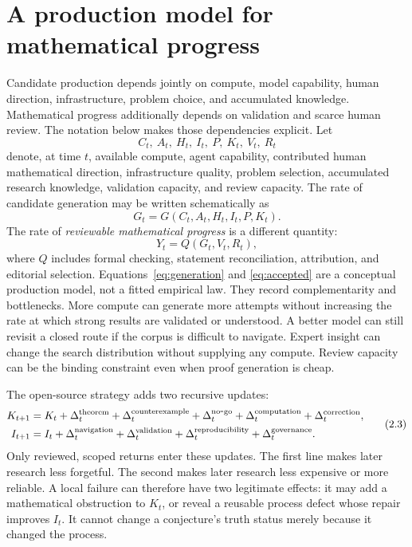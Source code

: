 \documentclass[10pt]{article}
\begin{document}
\section{A production model for mathematical progress}\label{sec:model}

Candidate production depends jointly on compute, model capability, human
direction, infrastructure, problem choice, and accumulated knowledge.
Mathematical progress additionally depends on validation and scarce human
review.  The notation below makes those dependencies explicit.  Let
\[
 C_t,\ A_t,\ H_t,\ I_t,\ P,\ K_t,\ V_t,\ R_t
\]
denote, at time $t$, available compute, agent capability, contributed human
mathematical direction, infrastructure quality, problem selection, accumulated
research knowledge, validation capacity, and review capacity.  The rate of
candidate generation may be written schematically as
\[
 G_t=G(C_t,A_t,H_t,I_t,P,K_t).
\tag{2.1}\label{eq:generation}
\]
The rate of \emph{reviewable mathematical progress} is a different quantity:
\[
 Y_t=Q(G_t,V_t,R_t),
\tag{2.2}\label{eq:accepted}
\]
where $Q$ includes formal checking, statement reconciliation, attribution,
and editorial selection.  Equations~\eqref{eq:generation} and
\eqref{eq:accepted} are a conceptual production model, not a fitted empirical
law.  They record complementarity and bottlenecks.  More compute can generate
more attempts without increasing the rate at which strong results are
validated or understood.  A better model can still revisit a closed route if
the corpus is difficult to navigate.  Expert insight can change the search
distribution without supplying any compute.  Review capacity can be the
binding constraint even when proof generation is cheap.

The open-source strategy adds two recursive updates:
\[
 \begin{aligned}
 K_{t+1}&=K_t+\Delta_t^{\rm theorem}
              +\Delta_t^{\rm counterexample}
              +\Delta_t^{\rm no\mbox{-}go}
              +\Delta_t^{\rm computation}
              +\Delta_t^{\rm correction},\\
 I_{t+1}&=I_t+\Delta_t^{\rm navigation}
              +\Delta_t^{\rm validation}
              +\Delta_t^{\rm reproducibility}
              +\Delta_t^{\rm governance}.
 \end{aligned}
\tag{2.3}\label{eq:feedback}
\]
Only reviewed, scoped returns enter these updates.  The first line makes later
research less forgetful.  The second makes later research less expensive or
more reliable.  A local failure can therefore have two legitimate effects: it
may add a mathematical obstruction to $K_t$, or reveal a reusable process
defect whose repair improves $I_t$.  It cannot change a conjecture's truth
status merely because it changed the process.
\end{document}
